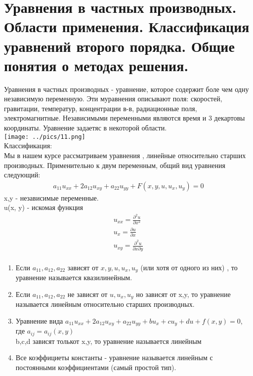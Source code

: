 \documentclass[12pt,a4paper]{article}
\begin{document}
	\section{Уравнения в частных производных. Области применения. Классификация уравнений второго порядка. Общие понятия о методах решения.}
	Уравнения в частных производных - уравнение, которое содержит боле чем одну независимую переменную. Эти муравнения описывают поля: скоростей, гравитации, температур, концентрации в-в, радиационные поля, электромагнитные. Независимыми переменными являются время и 3 декартовы координаты. Уравнение задаетяс в некоторой области.\\
	\texttt{[image: ../pics/11.png]}\\
	Классификация:\\
	Мы в  нашем курсе рассматриваем уравнения , линейные относительно старших производных. Применительно к двум переменным, общий вид уравнения следующий:\\
	\begin{align*}
	a_{11}u_{xx} + 2a_{12}u_{xy} + a_{22}u_{yy} + F(x, y, u, u_x, u_y) = 0
	\end{align*}
	x,y - независимые переменные. \\
	u(x, y) - искомая функция\\
	\begin{align*}
	u_{xx} = \frac{\partial^2 u}{\partial x^2}\\
	u_{x} = \frac{\partial u}{\partial x}\\
	u_{xy} = \frac{\partial^2 u}{\partial x \partial y}\\
	\end{align*}
	\begin{enumerate}
		\item Если $a_{11}, a_{12}, a_{22}$ зависят от $x,y,u,u_x,u_y$ (или хотя от одного из них) , то уравнение называется квазилинейным.
		\item Если $a_{11}, a_{12}, a_{22}$ не зависят от $u,u_x,u_y$ но зависят от x,y, то уравнение называется линейным относительно старших производных.
		\item  Уравнение вида $a_{11}u_{xx} + 2a_{12}u_{xy} + a_{22}u_{yy} + bu_x + cu_y + du + f(x,y) = 0$, где $a_{ij} = a_{ij}(x,y)$\\
		b,c,d зависят толькот x,y, то уравнение называется линейным
		\item Все коэффициеты константы - уравнение называется линейным с постоянными коэффициентами (самый простой тип).
	\end{enumerate}
\end{document}
